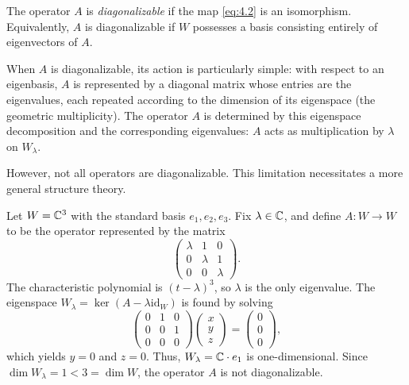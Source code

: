 \begin{definition}
The operator $A$ is \textit{diagonalizable} if the map \eqref{eq:4.2} is an isomorphism. Equivalently, $A$ is diagonalizable if $W$ possesses a basis consisting entirely of eigenvectors of $A$.
\end{definition}

When $A$ is diagonalizable, its action is particularly simple: with respect to an eigenbasis, $A$ is represented by a diagonal matrix whose entries are the eigenvalues, each repeated according to the dimension of its eigenspace (the geometric multiplicity). The operator $A$ is determined by this eigenspace decomposition and the corresponding eigenvalues: $A$ acts as multiplication by $\lambda$ on $W_{\lambda}$.

However, not all operators are diagonalizable. This limitation necessitates a more general structure theory.

\begin{example} \label{ex:jordan_block_example}
Let $W = \mathbb{C}^3$ with the standard basis $e_1, e_2, e_3$. Fix $\lambda \in \mathbb{C}$, and define $A: W \to W$ to be the operator represented by the matrix
\begin{equation*} \label{eq:4.4}
\begin{pmatrix} \lambda & 1 & 0 \\ 0 & \lambda & 1 \\ 0 & 0 & \lambda \end{pmatrix}.
\end{equation*}
The characteristic polynomial is $(t-\lambda)^3$, so $\lambda$ is the only eigenvalue. The eigenspace $W_\lambda = \ker(A - \lambda \text{id}_W)$ is found by solving
\[ \begin{pmatrix} 0 & 1 & 0 \\ 0 & 0 & 1 \\ 0 & 0 & 0 \end{pmatrix} \begin{pmatrix} x \\ y \\ z \end{pmatrix} = \begin{pmatrix} 0 \\ 0 \\ 0 \end{pmatrix}, \]
which yields $y=0$ and $z=0$. Thus, $W_\lambda = \mathbb{C} \cdot e_1$ is one-dimensional. Since $\dim W_\lambda = 1 < 3 = \dim W$, the operator $A$ is not diagonalizable.
\end{example}

